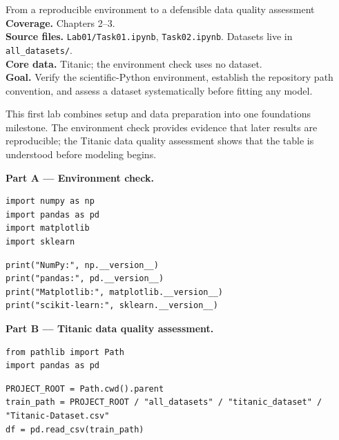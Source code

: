 
\begin{labproject}{From a reproducible environment to a defensible data quality assessment}
\textbf{Coverage.} Chapters 2--3.\\
\textbf{Source files.} \texttt{Lab01/Task01.ipynb}, \texttt{Task02.ipynb}. Datasets live in \texttt{all\_datasets/}.\\
\textbf{Core data.} Titanic; the environment check uses no dataset.\\
\textbf{Goal.} Verify the scientific-Python environment, establish the repository path convention, and assess a dataset systematically before fitting any model.

\begin{labmode}
This first lab combines setup and data preparation into one foundations milestone. The environment check provides evidence that later results are reproducible; the Titanic data quality assessment shows that the table is understood before modeling begins.
\end{labmode}

\medskip\noindent\textbf{Part A --- Environment check.}\par

\begin{lstlisting}[style=mlpython]
import numpy as np
import pandas as pd
import matplotlib
import sklearn
\end{lstlisting}

\begin{lstlisting}[style=mlpython]
print("NumPy:", np.__version__)
print("pandas:", pd.__version__)
print("Matplotlib:", matplotlib.__version__)
print("scikit-learn:", sklearn.__version__)
\end{lstlisting}



\medskip\noindent\textbf{Part B --- Titanic data quality assessment.}\par

\begin{lstlisting}[style=mlpython]
from pathlib import Path
import pandas as pd
\end{lstlisting}

\begin{lstlisting}[style=mlpython]
PROJECT_ROOT = Path.cwd().parent
train_path = PROJECT_ROOT / "all_datasets" / "titanic_dataset" / "Titanic-Dataset.csv"
df = pd.read_csv(train_path)
\end{lstlisting}


\end{labproject}
